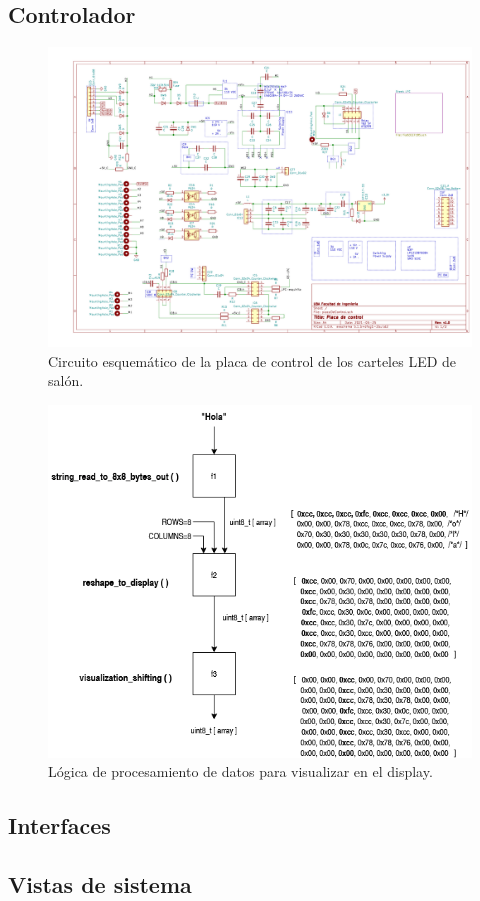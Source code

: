 \subsection{Controlador}

\begin{figure}[ht]
	\centering
	\includegraphics[width=1\textwidth]{./Figures/output.placaControl.pdf}
	\caption{Circuito esquemático de la placa de control de los carteles LED de salón.}
	\label{fig:schController}
\end{figure}

\begin{figure}[ht]
	\centering
	\includegraphics[width=1\textwidth]{./Figures/displayDataLogic.png}
	\caption{Lógica de procesamiento de datos para visualizar en el display.}
	\label{fig:displayDataLogic}
\end{figure}


\subsection{Interfaces}
\subsection{Vistas de sistema}
